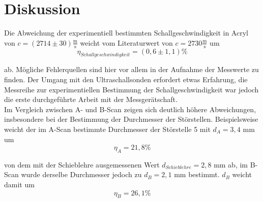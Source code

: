 \section{Diskussion}
\label{sec:Diskussion}


Die Abweichung der experimentiell bestimmten Schallgeschwindigkeit in Acryl von $c = (2714 \pm 30) \mathrm{\frac{m}{s}}$ weicht vom Literaturwert von $c = 2730 \mathrm{\frac{m}{s}}$ um
\begin{equation*}
\eta_{Schallgeschwindigkeit} = (0,6 \pm 1,1) \%
\end{equation*}

ab. Mögliche Fehlerquellen sind hier vor allem in der Aufnahme der Messwerte zu finden. 
Der Umgang mit den Ultraschallsonden erfordert etwas Erfahrung, die Messreihe zur experimentiellen Bestimmung der Schallgeschwindigkeit
war jedoch die erste durchgeführte Arbeit mit der Messgerätschaft.\\

Im Vergleich zwischen A- und B-Scan zeigen sich deutlich höhere Abweichungen, insbesondere bei der Bestimmung der Durchmesser der 
Störstellen. Beispielsweise weicht der im A-Scan bestimmte Durchmesser der Störstelle 5 mit $d_A = 3,4$ mm um 
\begin{equation*}
  \eta_A = 21,8 \%
\end{equation*}

von dem mit der 
Schieblehre ausgemessenen Wert $d_{Schieblehre} = 2,8$ mm ab, im B-Scan wurde derselbe Durchmesser jedoch zu $d_B = 2,1$ mm bestimmt. $d_B$ weicht damit 
um 
\begin{equation*}
  \eta_B = 26,1 \%
\end{equation*}

